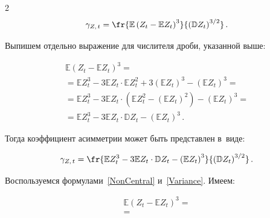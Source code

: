 \begin{multicols}{2}
\begin{equation*}

\gamma_{Z,\,t}=\fr{\mathbb{E} \left(Z_t-\mathbb{E} 

Z_t\right)^3}{\left(\mathbb{D} Z_t\right)^{3/2}}\,.

\end{equation*}



Выпишем отдельно выражение для числителя дроби, указанной выше:

\begin{multline*}

\mathbb{E} \left(Z_t-\mathbb{E} Z_t\right)^3={}\\

{}=

\mathbb{E} Z_t^3-3\mathbb{E} Z_t\cdot\mathbb{E} Z_t^2+3\left(

\mathbb{E} Z_t\right)^3-\left(\mathbb{E} Z_t\right)^3={}\\

{}=\mathbb{E} Z_t^3-3\mathbb{E} Z_t\cdot\left(\mathbb{E} Z_t^2-\left(

\mathbb{E} Z_t\right)^2\right)-\left(\mathbb{E} Z_t\right)^3={}\\

{}=\mathbb{E} Z_t^3-3\mathbb{E} Z_t\cdot\mathbb{D} Z_t-\left(\mathbb{E} Z_t\right)^3\,.

\end{multline*}



Тогда коэффициент асимметрии может быть представлен в~виде:

\begin{equation}

\gamma_{Z,\,t}=\fr{\mathbb{E} Z_t^3-3\mathbb{E} 

Z_t\cdot\mathbb{D} Z_t-\left(\mathbb{E} Z_t\right)^3}

{\left(\mathbb{D} Z_t\right)^{3/2}}\,.

\label{Skew}

\end{equation}



Воспользуемся формулами~\eqref{NonCentral} и~\eqref{Variance}. Имеем:

\begin{multline*}

\mathbb{E} \left(Z_t-\mathbb{E} Z_t\right)^3={}\\

{}=


\end{multline*}
\end{multicols}
